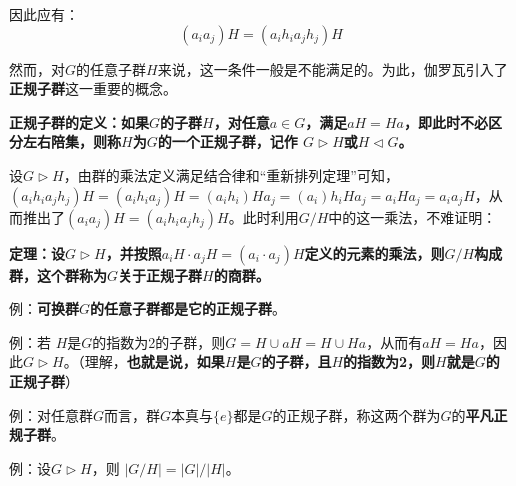 \documentclass[12pt]{article}
\begin{document}
因此应有：
$$
(a_ia_j)H = (a_ih_ia_jh_j)H
$$

然而，对$G$的任意子群$H$来说，这一条件一般是不能满足的。为此，伽罗瓦引入了\textbf{正规子群}这一重要的概念。
\begin{mdframed}[
linecolor=black!40,outerlinewidth=1pt,roundcorner=.5em,innertopmargin=1ex,innerbottommargin=.5\baselineskip,innerrightmargin=1em,innerleftmargin=1em,backgroundcolor=gray!5,
]
\textbf{
正规子群的定义：如果$G$的子群$H$，对任意$a \in G$，满足$aH = Ha$，即此时不必区分左右陪集，则称$H$为$G$的一个正规子群，记作 $G \rhd H$或$H \lhd G$。
}
\end{mdframed}

设$G \rhd H$，由群的乘法定义满足结合律和“重新排列定理”可知，$(a_ih_ia_jh_j)H = (a_ih_ia_j)H =  (a_ih_i)Ha_j =  (a_i)h_iHa_j = a_iHa_j = a_ia_jH$，从而推出了$(a_ia_j)H = (a_ih_ia_jh_j)H$。此时利用$G/H$中的这一乘法，不难证明：
\begin{mdframed}[
linecolor=black!40,outerlinewidth=1pt,roundcorner=.5em,innertopmargin=1ex,innerbottommargin=.5\baselineskip,innerrightmargin=1em,innerleftmargin=1em,backgroundcolor=gray!5,
]
\textbf{
定理：设$G \rhd H$，并按照$a_iH \cdot a_jH = (a_i\cdot a_j)H$定义的元素的乘法，则$G/H$构成群，这个群称为$G$关于正规子群$H$的商群。
}
\end{mdframed}

\begin{framed}
例：\textbf{可换群$G$的任意子群都是它的正规子群}。

例：若 $H$是$G$的指数为2的子群，则$G = H \cup aH = H \cup Ha$，从而有$aH = Ha$，因此$G \rhd H$。（理解，\textbf{也就是说，如果$H$是$G$的子群，且$H$的指数为2，则$H$就是$G$的正规子群}）

例：对任意群$G$而言，群$G$本真与$\{e\}$都是$G$的正规子群，称这两个群为$G$的\textbf{平凡正规子群}。

例：设$G \rhd H$，则 $|G/H| = |G| / |H|$。
\end{framed}
\end{document}
